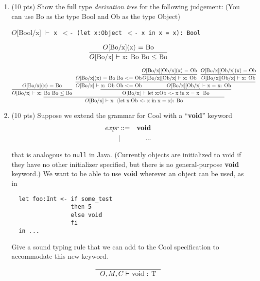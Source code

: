 \documentclass[10pt]{article}
\newcommand{\infertext}[2]{\infer{{\textrm{#1}}}{#2}}
\begin{document}
\begin{enumerate}
\item (10 pts) Show the full type \emph{derivation tree }for the following judgement:
(You can use Bo as the type Bool and Ob as the type Object)

\begin{center}
$O$[Bool/x] $\vdash$ \tt{x $<$- (let x:Object $<$- x in x = x): Bool}
\end{center}

\[ \infertext{$O$[Bo/x] $\vdash$ x: Bo  Bo $\leq$ Bo} {\textrm{$O$[Bo/x](x) = Bo}}
\]

\begin{equation}
  \infertext
    {$O$[Bo/x] $\vdash$ x: (let x:Ob $<$- x in x = x): Bo}
		{\textrm{\infertext{$O$[Bo/x] $\vdash$ x: Bo  Bo $\leq$ Bo}{\textrm{$O$[Bo/x](x) = Bo}}\ \ \infertext{O[Bo/x] $\vdash$ let x:Ob $<$- x in x = x: Bo}{{\infertext{$O$[Bo/x] $\vdash$ x: Ob Ob $<$= Ob}{\textrm{$O$[Bo/x](x) = Bo Bo $<$= Ob}}}{\infertext{$O$[Bo/x][Ob/x] $\vdash$ x = x: Ob}{\infertext{$O$[Bo/x][Ob/x] $\vdash$ x: Ob}{\textrm{$O$[Bo/x][Ob/x](x) = Ob}}\ \ \infertext{$O$[Bo/x][Ob/x] $\vdash$ x: Ob}{\textrm{$O$[Bo/x][Ob/x](x) = Ob}}}}}}}
\end{equation}

\medskip
\item (10 pts) Suppose we extend the grammar for Cool with a ``{\bf void}'' keyword
\begin{eqnarray*}
  expr & ::= & {\bf void} \\
       & |   & ...
\end{eqnarray*}

  that is analogous to {\tt null} in Java. (Currently objects are
  initialized to void if they have no other initializer specified, but
  there is no general-purpose {\bf void} keyword.)  We want to be able
  to use {\bf void} wherever an object can be used, as in
\begin{verbatim}
  let foo:Int <- if some_test
                 then 5
                 else void
                 fi
  in ...
\end{verbatim}

  Give a sound typing rule that we can add to the Cool specification
  to accommodate this new keyword.

  \[\infertext{
    \textrm{ $O, M, C \vdash$ void  : T }	} 
  {}\]


\end{enumerate}
\end{document}
